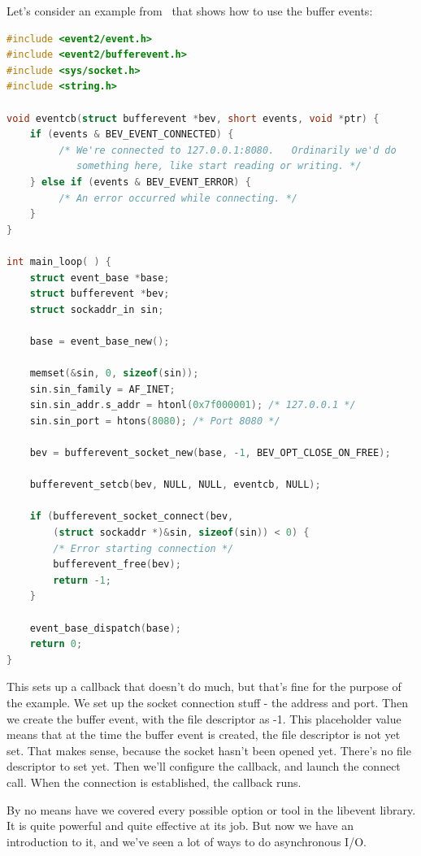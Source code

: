Let's consider an example from~\cite{libevent} that shows how to use the buffer events:
\begin{lstlisting}[language=C]
#include <event2/event.h>
#include <event2/bufferevent.h>
#include <sys/socket.h>
#include <string.h>

void eventcb(struct bufferevent *bev, short events, void *ptr) {
    if (events & BEV_EVENT_CONNECTED) {
         /* We're connected to 127.0.0.1:8080.   Ordinarily we'd do
            something here, like start reading or writing. */
    } else if (events & BEV_EVENT_ERROR) {
         /* An error occurred while connecting. */
    }
}

int main_loop( ) {
    struct event_base *base;
    struct bufferevent *bev;
    struct sockaddr_in sin;

    base = event_base_new();

    memset(&sin, 0, sizeof(sin));
    sin.sin_family = AF_INET;
    sin.sin_addr.s_addr = htonl(0x7f000001); /* 127.0.0.1 */
    sin.sin_port = htons(8080); /* Port 8080 */

    bev = bufferevent_socket_new(base, -1, BEV_OPT_CLOSE_ON_FREE);

    bufferevent_setcb(bev, NULL, NULL, eventcb, NULL);

    if (bufferevent_socket_connect(bev,
        (struct sockaddr *)&sin, sizeof(sin)) < 0) {
        /* Error starting connection */
        bufferevent_free(bev);
        return -1;
    }

    event_base_dispatch(base);
    return 0;
}
\end{lstlisting}

This sets up a callback that doesn't do much, but that's fine for the purpose of the example. We set up the socket connection stuff - the address and port. Then we create the buffer event, with the file descriptor as -1. This placeholder value means that at the time the buffer event is created, the file descriptor is not yet set. That makes sense, because the socket hasn't been opened yet. There's no file descriptor to set yet. Then we'll configure the callback, and launch the connect call. When the connection is established, the callback runs.

By no means have we covered every possible option or tool in the libevent library. It is quite powerful and quite effective at its job. But now we have an introduction to it, and we've seen a lot of ways to do asynchronous I/O.




